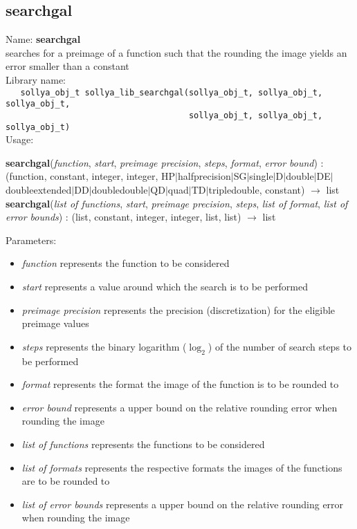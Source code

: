 \subsection{searchgal}
\label{labsearchgal}
\noindent Name: \textbf{searchgal}\\
\phantom{aaa}searches for a preimage of a function such that the rounding the image yields an error smaller than a constant\\[0.2cm]
\noindent Library name:\\
\verb|   sollya_obj_t sollya_lib_searchgal(sollya_obj_t, sollya_obj_t, sollya_obj_t,|\\
\verb|                                     sollya_obj_t, sollya_obj_t, sollya_obj_t)|\\[0.2cm]
\noindent Usage: 
\begin{center}
\textbf{searchgal}(\emph{function}, \emph{start}, \emph{preimage precision}, \emph{steps}, \emph{format}, \emph{error bound}) : (\textsf{function}, \textsf{constant}, \textsf{integer}, \textsf{integer}, \textsf{HP$|$halfprecision$|$SG$|$single$|$D$|$double$|$DE$|$doubleextended$|$DD$|$doubledouble$|$QD$|$quad$|$TD$|$tripledouble}, \textsf{constant}) $\rightarrow$ \textsf{list}\\
\textbf{searchgal}(\emph{list of functions}, \emph{start}, \emph{preimage precision}, \emph{steps}, \emph{list of format}, \emph{list of error bounds}) : (\textsf{list}, \textsf{constant}, \textsf{integer}, \textsf{integer}, \textsf{list}, \textsf{list}) $\rightarrow$ \textsf{list}\\
\end{center}
Parameters: 
\begin{itemize}
\item \emph{function} represents the function to be considered
\item \emph{start} represents a value around which the search is to be performed
\item \emph{preimage precision} represents the precision (discretization) for the eligible preimage values
\item \emph{steps} represents the binary logarithm ($\log_2$) of the number of search steps to be performed
\item \emph{format} represents the format the image of the function is to be rounded to
\item \emph{error bound} represents a upper bound on the relative rounding error when rounding the image
\item \emph{list of functions} represents the functions to be considered
\item \emph{list of formats} represents the respective formats the images of the functions are to be rounded to
\item \emph{list of error bounds} represents a upper bound on the relative rounding error when rounding the image
\end{itemize}
